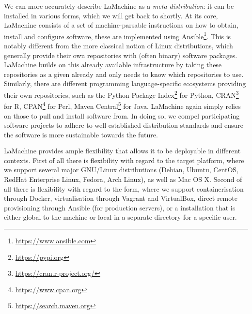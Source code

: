 \documentclass[a4paper,11pt]{article}
\begin{document}
We can more accurately describe LaMachine as a \emph{meta distribution}: it can be installed in various forms, which we
will get back to shortly. At its core, LaMachine consists of a set of machine-parsable instructions on how to obtain,
install and configure software, these are implemented using Ansible\footnote{\url{https://www.ansible.com}}. This is
notably different from the more classical notion of Linux distributions, which generally provide their own repositories
with (often binary) software packages. LaMachine builds on this already available infrastructure by taking these
repositories as a given already and only needs to know which repositories to use.  Similarly, there are different
programming language-specific ecosystems providing their own repositories, such as the Python Package
Index\footnote{\url{https://pypi.org}} for Python, CRAN\footnote{\url{https://cran.r-project.org/}} for R,
CPAN\footnote{\url{https://www.cpan.org}} for Perl, Maven Central\footnote{\url{https://search.maven.org}} for Java.
LaMachine again simply relies on those to pull and install software from. In doing so, we compel participating software
projects to adhere to well-established distribution standards and ensure the software is more sustainable towards the
future.

LaMachine provides ample flexibility that allows it to be deployable in different contexts. First of all there is
flexibility with regard to the target platform, where we support several major GNU/Linux distributions (Debian, Ubuntu,
CentOS, RedHat Enterprise Linux, Fedora, Arch Linux), as well as Mac OS X. Second of all there is flexibility with
regard to the form, where we support containerisation through Docker, virtualisation through Vagrant and VirtualBox,
direct remote provisioning through Ansible (for production servers), or a installation that is either global to the
machine or local in a separate directory for a specific user.
\end{document}
